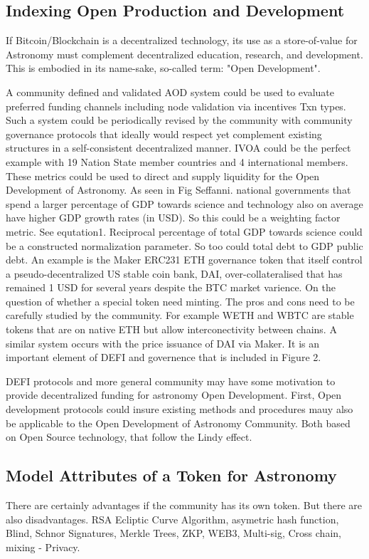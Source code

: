 \documentclass[final,5p,times,twocolumn,authoryear]{elsarticle}
\begin{document}
\subsection{Indexing Open Production and Development}

If Bitcoin/Blockchain is a decentralized technology, its use as a store-of-value for Astronomy must complement decentralized education, research, and development. This is embodied in its name-sake, so-called term: "Open Development".

A community defined and validated AOD system could be used to evaluate preferred funding channels including node validation via incentives Txn types. Such a system could be periodically revised by the community with community governance protocols that ideally would respect yet complement existing structures in a self-consistent decentralized manner. IVOA could be the perfect example with 19 Nation State member countries and 4 international members. These metrics could be used to direct and supply liquidity for the Open Development of Astronomy. As seen in Fig Seffanni. national governments that spend a larger percentage of GDP towards science and technology also on average have higher GDP growth rates (in USD). So this could be a weighting factor metric. See equtation1. Reciprocal percentage of total GDP towards science could be a constructed normalization parameter. So too could total debt to GDP public debt.  An example is the Maker ERC231 ETH governance token that itself control a  pseudo-decentralized US stable coin bank, DAI, over-collateralised that has remained 1 USD for several years despite the BTC market varience.  On the question of whether a special token need minting. The pros and cons need to be carefully studied by the community. For example WETH and WBTC are stable tokens that are on native ETH but allow interconectivity between chains. A similar system occurs with the price issuance of DAI via Maker. It is an important element of DEFI and governence that is included in Figure 2.   

DEFI protocols and more general community may have some motivation to provide decentralized funding for astronomy Open Development. First, Open development protocols could insure existing methods and procedures mauy also be applicable to the Open Development of Astronomy Community. Both  based on Open Source technology, that follow the Lindy effect.
 
\subsection{Model Attributes of a Token for Astronomy}
\label{subsec:btc4}
There are certainly advantages if the community has its own token. But there are also disadvantages. RSA Ecliptic Curve Algorithm, asymetric hash function, Blind, Schnor Signatures, Merkle Trees, ZKP,  WEB3, Multi-sig, Cross chain, mixing - Privacy. 
\end{document}
